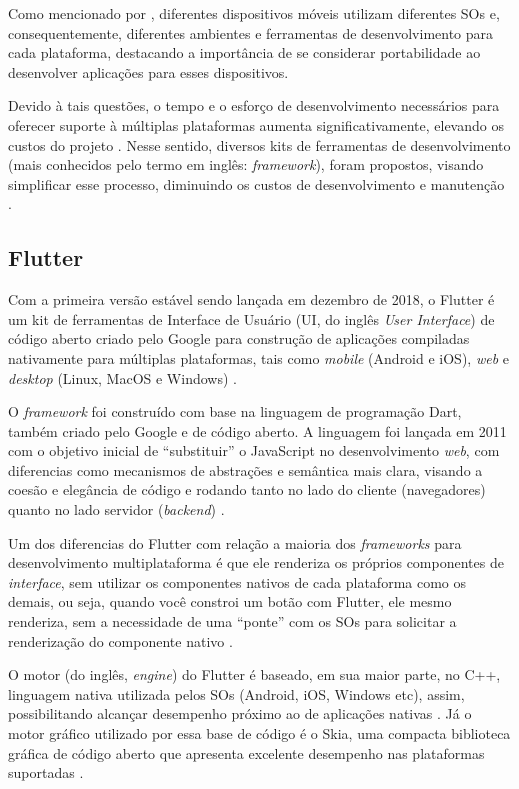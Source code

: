 Como mencionado por , diferentes dispositivos móveis utilizam diferentes SOs e, consequentemente, diferentes
ambientes e ferramentas de desenvolvimento para cada plataforma, destacando a importância de se considerar portabilidade ao desenvolver aplicações
para esses dispositivos.

Devido à tais questões, o tempo e o esforço de desenvolvimento necessários para oferecer suporte à múltiplas plataformas aumenta
significativamente, elevando os custos do projeto \cite{Henning2013,Wasserman2010}. Nesse sentido, diversos kits de ferramentas de
desenvolvimento (mais conhecidos pelo termo em inglês: \emph{framework}), foram propostos, visando simplificar esse processo, diminuindo os
custos de desenvolvimento e manutenção \cite{Martinez2017,Francese2015}.

\subsection{Flutter}

Com a primeira versão estável sendo lançada em dezembro de 2018, o Flutter é um kit de ferramentas de Interface
de Usuário (UI, do inglês \emph{User Interface}) de código aberto criado pelo Google para construção de aplicações compiladas nativamente
para múltiplas plataformas, tais como \emph{mobile} (Android e iOS), \emph{web} e \emph{desktop} (Linux, MacOS e Windows) \cite{kuzmin2020experience}.

O \emph{framework} foi construído com base na linguagem de programação Dart, também criado pelo Google e de código aberto.
A linguagem foi lançada em 2011 com o objetivo inicial de ``substituir'' o JavaScript no desenvolvimento \emph{web},
com diferencias como mecanismos de abstrações e semântica mais clara, visando a coesão e elegância de código e
rodando tanto no lado do cliente (navegadores) quanto no lado servidor
(\emph{backend}) \cite{walrath2012dart}.

Um dos diferencias do Flutter com relação a maioria dos \emph{frameworks} para desenvolvimento multiplataforma é que ele renderiza os próprios
componentes de \emph{interface}, sem utilizar os componentes nativos de cada plataforma como os demais, ou seja, quando você constroi um botão com Flutter,
ele mesmo renderiza, sem a necessidade de uma ``ponte'' com os SOs para solicitar a renderização do componente nativo \cite{zammetti2019practical,boukhary2019clean}.

O motor (do inglês, \emph{engine}) do Flutter é baseado, em sua maior parte, no C++, linguagem nativa utilizada pelos SOs (Android, iOS, Windows etc), assim,
possibilitando alcançar desempenho próximo ao de aplicações nativas \cite{zammetti2019practical,kuzmin2020experience}. Já o motor gráfico utilizado por essa
base de código é o Skia, uma compacta biblioteca gráfica de código aberto que apresenta excelente desempenho nas plataformas
suportadas \cite{zammetti2019practical,boukhary2019clean}.

